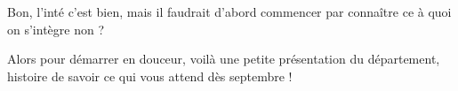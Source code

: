 Bon, l'inté c'est bien, mais il faudrait d'abord commencer par connaître ce à quoi on s'intègre non ? 

Alors pour démarrer en douceur, voilà une petite présentation du département, histoire de savoir ce qui vous attend dès septembre ! 

